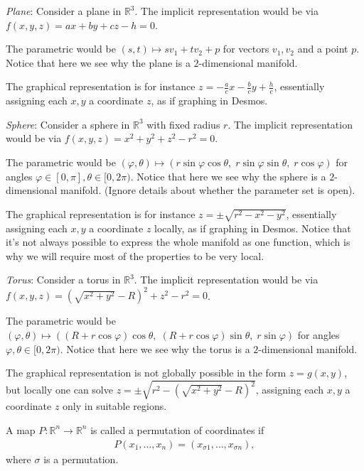 \begin{eg}
	\textit{Plane}: Consider a plane in $\mathbb{R}^{3}$. The implicit representation would be via $f(x,y,z) = ax + by + cz - h = 0$.

	The parametric would be $(s,t) \mapsto s v_{1} + t v_{2} + p$ for vectors $v_{1}, v_{2}$ and a point $p$. Notice that here we see why the plane is a $2$-dimensional manifold.

	The graphical representation is for instance $z = -\frac{a}{c}x - \frac{b}{c}y + \frac{h}{c}$, essentially assigning each $x,y$ a coordinate $z$, as if graphing in Desmos.

	\textit{Sphere}: Consider a sphere in $\mathbb{R}^{3}$ with fixed radius $r$. The implicit representation would be via $f(x,y,z) = x^2 + y^2 + z^2 - r^2 = 0$.

	The parametric would be $(\varphi,\theta) \mapsto (r \sin \varphi \cos \theta,\; r \sin \varphi \sin \theta,\; r \cos \varphi)$ for angles $\varphi \in [0,\pi], \theta \in [0,2\pi)$. Notice that here we see why the sphere is a $2$-dimensional manifold. (Ignore details about whether the parameter set is open).

	The graphical representation is for instance $z = \pm \sqrt{r^2 - x^2 - y^2}$, essentially assigning each $x,y$ a coordinate $z$ locally, as if graphing in Desmos. Notice that it's not always possible to express the whole manifold as one function, which is why we will require most of the properties to be very local.

	\textit{Torus}: Consider a torus in $\mathbb{R}^{3}$. The implicit representation would be via $f(x,y,z) = \left(\sqrt{x^2 + y^2} - R\right)^2 + z^2 - r^2 = 0$.

	The parametric would be $(\varphi,\theta) \mapsto ((R + r \cos \varphi)\cos \theta,\; (R + r \cos \varphi)\sin \theta,\; r \sin \varphi)$ for angles $\varphi,\theta \in [0,2\pi)$. Notice that here we see why the torus is a $2$-dimensional manifold.

	The graphical representation is not globally possible in the form $z = g(x,y)$, but locally one can solve
	$z = \pm \sqrt{r^2 - \left(\sqrt{x^2 + y^2} - R\right)^2}$, assigning each $x,y$ a coordinate $z$ only in suitable regions.
\end{eg}

\begin{definition}\label{def:perm-coord}
	A map $P: \mathbb{R}^{n} \to \mathbb{R}^{n}$ is called a permutation of coordinates if
	\begin{align*}
		P(x_{1}, \dots, x_{n}) = (x_{\sigma 1}, \dots, x_{\sigma n}),
	\end{align*}
	where $\sigma$ is a permutation.
\end{definition}

